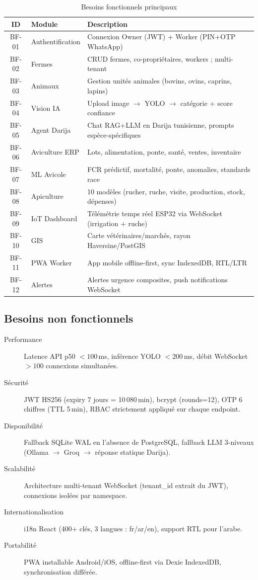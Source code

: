 \begin{table}[H]
\centering
\caption{Besoins fonctionnels principaux}
\label{tab:bf}
\begin{tabularx}{\linewidth}{clX}
\toprule
\textbf{ID} & \textbf{Module} & \textbf{Description} \\
\midrule
BF-01 & Authentification & Connexion Owner (JWT) + Worker (PIN+OTP WhatsApp) \\
BF-02 & Fermes & CRUD fermes, co-propriétaires, workers ; multi-tenant \\
BF-03 & Animaux & Gestion unités animales (bovins, ovins, caprins, lapins) \\
BF-04 & Vision IA & Upload image $\rightarrow$ YOLO $\rightarrow$ catégorie + score confiance \\
BF-05 & Agent Darija & Chat RAG+LLM en Darija tunisienne, prompts espèce-spécifiques \\
BF-06 & Aviculture ERP & Lots, alimentation, ponte, santé, ventes, inventaire \\
BF-07 & ML Avicole & FCR prédictif, mortalité, ponte, anomalies, standards race \\
BF-08 & Apiculture & 10 modèles (rucher, ruche, visite, production, stock, dépenses) \\
BF-09 & IoT Dashboard & Télémétrie temps réel ESP32 via WebSocket (irrigation + ruche) \\
BF-10 & GIS & Carte vétérinaires/marchés, rayon Haversine/PostGIS \\
BF-11 & PWA Worker & App mobile offline-first, sync IndexedDB, RTL/LTR \\
BF-12 & Alertes & Alertes urgence composites, push notifications WebSocket \\
\bottomrule
\end{tabularx}
\end{table}

\subsection{Besoins non fonctionnels}

\begin{description}
  \item[Performance] Latence API p50 $< 100$\,ms, inférence YOLO $< 200$\,ms,
        débit WebSocket $> 100$ connexions simultanées.
  \item[Sécurité] JWT HS256 (expiry 7 jours = 10\,080\,min), bcrypt (rounds=12), OTP 6 chiffres
        (TTL 5\,min), RBAC strictement appliqué sur chaque endpoint.
  \item[Disponibilité] Fallback SQLite WAL en l'absence de PostgreSQL,
        fallback LLM 3-niveaux (Ollama $\rightarrow$ Groq $\rightarrow$ réponse statique Darija).
  \item[Scalabilité] Architecture multi-tenant WebSocket (tenant\_id extrait
        du JWT), connexions isolées par namespace.
  \item[Internationalisation] i18n React (400+ clés, 3 langues : fr/ar/en),
        support RTL pour l'arabe.
  \item[Portabilité] PWA installable Android/iOS, offline-first via Dexie
        IndexedDB, synchronisation différée.
\end{description}

